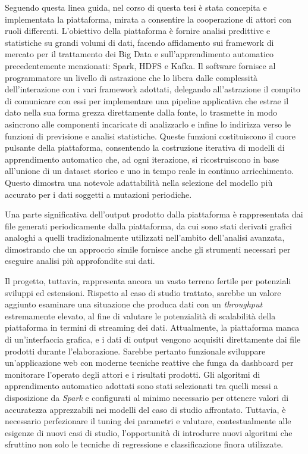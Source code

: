 Seguendo questa linea guida, nel corso di questa tesi è stata concepita e implementata la piattaforma, mirata a consentire la cooperazione di attori con ruoli differenti.
L'obiettivo della piattaforma è fornire analisi predittive e statistiche su grandi volumi di dati, facendo affidamento sui framework di mercato per il trattamento dei Big Data e sull'apprendimento automatico precedentemente menzionati: Spark, HDFS e Kafka.
Il software fornisce al programmatore un livello di astrazione che lo libera dalle complessità dell'interazione con i vari framework adottati, delegando all'astrazione il compito di comunicare con essi per implementare una pipeline applicativa che estrae il dato nella sua forma grezza direttamente dalla fonte, lo trasmette in modo asincrono alle componenti incaricate di analizzarlo e infine lo indirizza verso le funzioni di previsione e analisi statistiche.
Queste funzioni costituiscono il cuore pulsante della piattaforma, consentendo la costruzione iterativa di modelli di apprendimento automatico che, ad ogni iterazione, si ricostruiscono in base all'unione di un dataset storico e uno in tempo reale in continuo arricchimento.
Questo dimostra una notevole adattabilità nella selezione del modello più accurato per i dati soggetti a mutazioni periodiche.

Una parte significativa dell'output prodotto dalla piattaforma è rappresentata dai file generati periodicamente dalla piattaforma, da cui sono stati derivati grafici analoghi a quelli tradizionalmente utilizzati nell'ambito dell'analisi avanzata, dimostrando che un approccio simile fornisce anche gli strumenti necessari per eseguire analisi più approfondite sui dati.

Il progetto, tuttavia, rappresenta ancora un vasto terreno fertile per potenziali sviluppi ed estensioni.
Rispetto al caso di studio trattato, sarebbe un valore aggiunto esaminare una situazione che produca dati con un \textit{throughput} estremamente elevato, al fine di valutare le potenzialità di scalabilità della piattaforma in termini di streaming dei dati.
Attualmente, la piattaforma manca di un'interfaccia grafica, e i dati di output vengono acquisiti direttamente dai file prodotti durante l'elaborazione.
Sarebbe pertanto funzionale sviluppare un'applicazione web con moderne tecniche reattive che funga da dashboard per monitorare l'operato degli attori e i risultati prodotti.
Gli algoritmi di apprendimento automatico adottati sono stati selezionati tra quelli messi a disposizione da \textit{Spark} e configurati al minimo necessario per ottenere valori di accuratezza apprezzabili nei modelli del caso di studio affrontato.
Tuttavia, è necessario perfezionare il tuning dei parametri e valutare, contestualmente alle esigenze di nuovi casi di studio, l'opportunità di introdurre nuovi algoritmi che sfruttino non solo le tecniche di regressione e classificazione finora utilizzate.

